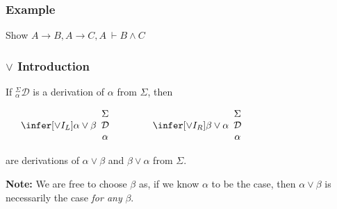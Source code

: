 \documentclass{beamer}
\begin{document}
\begin{frame}
	\frametitle{Example}

	Show $A \to B, A \to C, A \ \vdash B \land C$
	
	\vspace{6cm}

\end{frame}

\begin{frame}
	\frametitle{$\lor$ Introduction}
	
	If $^{\Sigma}_{\alpha}\mathcal{D}$ is a derivation of $\alpha$ from $\Sigma$, then 
	
	\begin{center}
		
	$\begin{array}{ c c c }	
		\begin{array}{ c c }		
			\begin{array}{c}		
				\infer[\lor I_{L}]{\alpha \lor \beta}
				{\begin{array}{c} \Sigma \\ \mathcal{D} \\ \alpha \end{array}}
			\end{array}
		\end{array}
		
		&
		
		&
		
		\begin{array}{ c c }		
			\begin{array}{c}		
				\infer[\lor I_{R}]{\beta \lor \alpha}
				{\begin{array}{c} \Sigma \\ \mathcal{D} \\ \alpha \end{array}}
			\end{array}
		\end{array}		
		
		
	\end{array}$
	\end{center}
	
	are derivations of $\alpha \lor \beta$ and $\beta \lor \alpha$ from $\Sigma$. 
	
	\vspace{10mm}
	
	{\bf Note:} We are free to choose $\beta$ as, if we know $\alpha$ to be the case, then $\alpha \lor \beta$  is necessarily the case \emph{for any }$\beta$. 
	
\end{frame}
\end{document}
